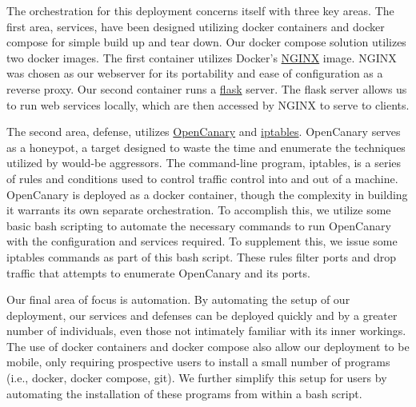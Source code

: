 The orchestration for this deployment concerns itself with three key areas. The first area, services, 
have been designed utilizing docker containers and docker compose for simple build up and tear down. 
Our docker compose solution utilizes two docker images. The first container utilizes Docker's \hyperlink{https://nginx.org/en/}{NGINX}
image. NGINX was chosen as our webserver for its portability and ease of configuration as a reverse proxy.
Our second container runs a \hyperlink{https://flask.palletsprojects.com/en/3.0.x/}{flask} server. 
The flask server allows us to run web services locally, which are then accessed by NGINX to serve to clients.

The second area, defense, utilizes \hyperlink{https://opencanary.readthedocs.io/en/latest/}{OpenCanary} 
and \hyperlink{https://www.redhat.com/sysadmin/iptables}{iptables}. OpenCanary serves as a honeypot, a target 
designed to waste the time and enumerate the techniques utilized by would-be aggressors. The command-line program, 
iptables, is a series of rules and conditions used to control traffic control into and out of a machine. OpenCanary 
is deployed as a docker container, though the complexity in building it warrants its own separate orchestration. To accomplish this, we utilize some basic bash scripting to automate the necessary commands to run OpenCanary with the configuration and 
services required. To supplement this, we issue some iptables commands as part of this bash script. These rules filter ports and 
drop traffic that attempts to enumerate OpenCanary and its ports. 

Our final area of focus is automation. By automating the setup of our deployment, our services and defenses can be deployed quickly and by a greater number of individuals, even those not intimately familiar with its inner workings. 
The use of docker containers and docker compose also allow our deployment to be mobile, only requiring 
prospective users to install a small number of programs (i.e., docker, docker compose, git). We further simplify this 
setup for users by automating the installation of these programs from within a bash script.
